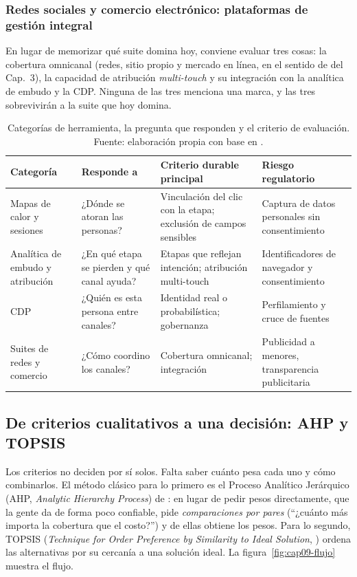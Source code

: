 \subsubsection{Redes sociales y comercio electrónico: plataformas de gestión integral}

En lugar de memorizar qué suite domina hoy, conviene evaluar tres cosas: la
cobertura omnicanal (redes, sitio propio y mercado en línea, en el sentido
de \textcite{verhoef2015} del Cap.~3), la capacidad de atribución
\emph{multi-touch} y su integración con la analítica de embudo y la CDP. Ninguna
de las tres menciona una marca, y las tres sobrevivirán a la suite que hoy
domina.

\begin{table}[!htb]
\centering
\begin{tabular}{@{}>{\raggedright}p{3.0cm}>{\raggedright}p{3.5cm}>{\raggedright}p{3.7cm}>{\raggedright\arraybackslash}p{2.5cm}@{}}
\toprule
Categoría & Responde a & Criterio durable principal & Riesgo regulatorio \\
\midrule
Mapas de calor y sesiones & ¿Dónde se atoran las personas? & Vinculación del clic con la etapa; exclusión de campos sensibles & Captura de datos personales sin consentimiento \\
Analítica de embudo y atribución & ¿En qué etapa se pierden y qué canal ayuda? & Etapas que reflejan intención; atribución multi-touch & Identificadores de navegador y consentimiento \\
CDP & ¿Quién es esta persona entre canales? & Identidad real o probabilística; gobernanza & Perfilamiento y cruce de fuentes \\
Suites de redes y comercio & ¿Cómo coordino los canales? & Cobertura omnicanal; integración & Publicidad a menores, transparencia publicitaria \\
\bottomrule
\end{tabular}
\caption{Categorías de herramienta, la pregunta que responden y el criterio de
evaluación. Fuente: elaboración propia con base en
\textcite{gartner2026cdp,verhoef2015}.}
\label{tab:cap09-categorias}
\end{table}

\subsection{De criterios cualitativos a una decisión: AHP y TOPSIS}
\label{sec:cap09-metodo}

Los criterios no deciden por sí solos. Falta saber cuánto pesa cada uno y
cómo combinarlos. El método clásico para lo primero es el Proceso Analítico
Jerárquico (AHP, \textit{Analytic Hierarchy Process}) de \textcite{saaty1977}:
en lugar de pedir pesos directamente, que la gente da de forma poco confiable,
pide \emph{comparaciones por pares} (\enquote{¿cuánto más importa la cobertura
que el costo?}) y de ellas obtiene los pesos. Para lo segundo,
TOPSIS (\textit{Technique for Order Preference by Similarity to Ideal
Solution}, \textcite{hwang1981}) ordena las alternativas por su cercanía a una
solución ideal. La figura~\ref{fig:cap09-flujo} muestra el flujo.

